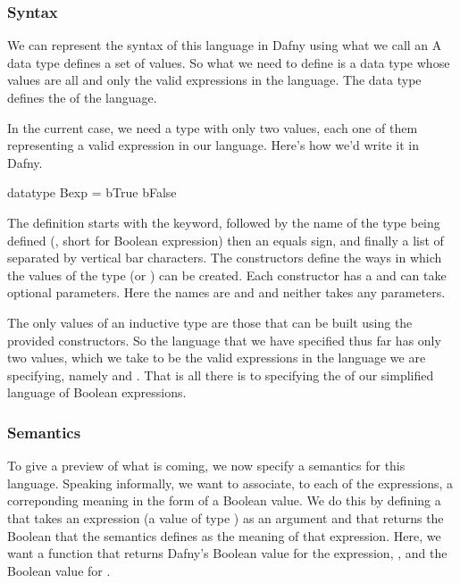 \documentclass[letterpaper,10pt,english]{sphinxmanual}
\begin{document}
\subsubsection{Syntax}
\label{\detokenize{08-boolean-algebra:syntax}}
We can represent the syntax of this language in Dafny using what we
call an  A data type defines a set of
values. So what we need to define is a data type whose values are all
and only the valid expressions in the language. The data type defines
the  of the language.

In the current case, we need a type with only two values, each one of
them representing a valid expression in our language. Here’s how we’d
write it in Dafny.

\begin{sphinxVerbatim}[commandchars=\\\{\}]
datatype Bexp =
     bTrue \textbar{}
     bFalse
\end{sphinxVerbatim}

The definition starts with the  keyword, followed by the
name of the type being defined (, short for Boolean expression)
then an equals sign, and finally a list of  separated by
vertical bar characters. The constructors define the ways in which the
values of the type (or ) can be created. Each constructor has a
and can take optional parameters. Here the names are  and
 and neither takes any parameters.

The only values of an inductive type are those that can be built using
the provided constructors. So the language that we have specified thus
far has only two values, which we take to be the valid expressions in
the language we are specifying, namely  and .  That is
all there is to specifying the  of our simplified language of
Boolean expressions.


\subsubsection{Semantics}
\label{\detokenize{08-boolean-algebra:semantics}}
To give a preview of what is coming, we now specify a semantics for
this language. Speaking informally, we want to associate, to each of
the expressions, a correponding meaning in the form of a Boolean
value.  We do this by defining a  that takes an expression
(a value of type ) as an argument and that returns the Boolean
 that the semantics defines as the meaning of that expression.
Here, we want a function that returns Dafny’s Boolean value  for
the expression, , and the Boolean value  for .
\end{document}
